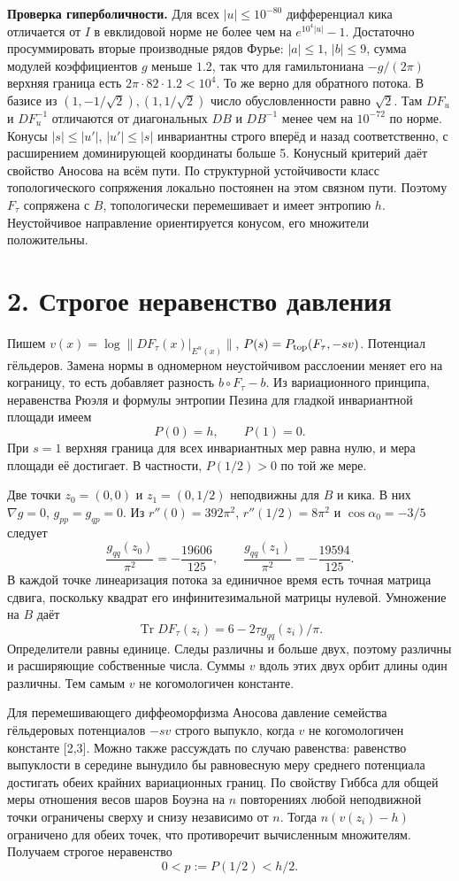 \documentclass[11pt,a4paper]{article}
\newcommand{\Tr}{\operatorname{Tr}}
\newcommand{\sect}[1]{\section*{\sffamily\color{ink}#1}}
\newcommand{\subt}[1]{\par\medskip\noindent\textbf{#1.}\quad}
\begin{document}
\subt{Проверка гиперболичности} Для всех $|u|\le10^{-80}$ дифференциал кика отличается от $I$ в евклидовой норме не более чем на $e^{10^4|u|}-1$. Достаточно просуммировать вторые производные рядов Фурье: $|a|\le1$, $|b|\le9$, сумма модулей коэффициентов $g$ меньше $1.2$, так что для гамильтониана $-g/(2\pi)$ верхняя граница есть $2\pi\cdot82\cdot1.2<10^4$. То же верно для обратного потока. В базисе из $(1,-1/\sqrt2),(1,1/\sqrt2)$ число обусловленности равно $\sqrt2$. Там $DF_u$ и $DF_u^{-1}$ отличаются от диагональных $DB$ и $DB^{-1}$ менее чем на $10^{-72}$ по норме. Конусы $|s|\le|u'|$, $|u'|\le|s|$ инвариантны строго вперёд и назад соответственно, с расширением доминирующей координаты больше 5. Конусный критерий даёт свойство Аносова на всём пути. По структурной устойчивости класс топологического сопряжения локально постоянен на этом связном пути. Поэтому $F_\tau$ сопряжена с $B$, топологически перемешивает и имеет энтропию $h$. Неустойчивое направление ориентируется конусом, его множители положительны.
\newpage
\sect{2. Строгое неравенство давления}
Пишем $v(x)=\log\|DF_\tau(x)|_{E^u(x)}\|$, $P(s)=P_{\rm top}(F_\tau,-sv)$. Потенциал гёльдеров. Замена нормы в одномерном неустойчивом расслоении меняет его на кограницу, то есть добавляет разность $b\circ F_\tau-b$. Из вариационного принципа, неравенства Рюэля и формулы энтропии Пезина для гладкой инвариантной площади имеем
\[
 P(0)=h,\qquad P(1)=0.
\]
При $s=1$ верхняя граница для всех инвариантных мер равна нулю, и мера площади её достигает. В частности, $P(1/2)>0$ по той же мере.

Две точки $z_0=(0,0)$ и $z_1=(0,1/2)$ неподвижны для $B$ и кика. В них $\nabla g=0$, $g_{pp}=g_{qp}=0$. Из $r''(0)=392\pi^2$, $r''(1/2)=8\pi^2$ и $\cos\alpha_0=-3/5$ следует
\[
 \frac{g_{qq}(z_0)}{\pi^2}=-\frac{19606}{125},\qquad
 \frac{g_{qq}(z_1)}{\pi^2}=-\frac{19594}{125}.
\]
В каждой точке линеаризация потока за единичное время есть точная матрица сдвига, поскольку квадрат его инфинитезимальной матрицы нулевой. Умножение на $B$ даёт
\[
 \Tr DF_\tau(z_i)=6-2\tau g_{qq}(z_i)/\pi .
\]
Определители равны единице. Следы различны и больше двух, поэтому различны и расширяющие собственные числа. Суммы $v$ вдоль этих двух орбит длины один различны. Тем самым $v$ не когомологичен константе.

Для перемешивающего диффеоморфизма Аносова давление семейства гёльдеровых потенциалов $-sv$ строго выпукло, когда $v$ не когомологичен константе [2,3]. Можно также рассуждать по случаю равенства: равенство выпуклости в середине вынудило бы равновесную меру среднего потенциала достигать обеих крайних вариационных границ. По свойству Гиббса для общей меры отношения весов шаров Боуэна на $n$ повторениях любой неподвижной точки ограничены сверху и снизу независимо от $n$. Тогда $n(v(z_i)-h)$ ограничено для обеих точек, что противоречит вычисленным множителям. Получаем строгое неравенство
\[
 0<p:=P(1/2)<h/2.                                                        \tag{3}
\]
\end{document}
